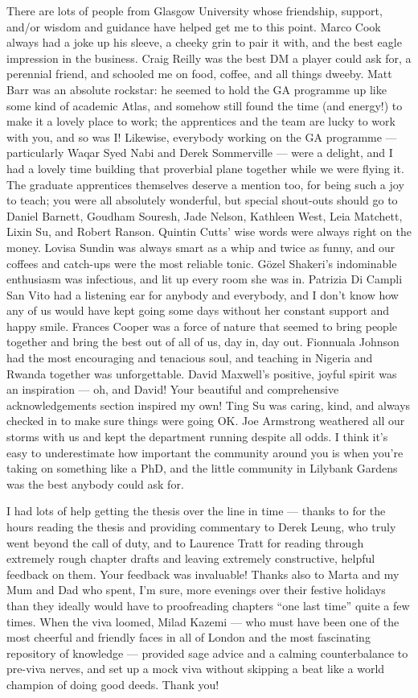 {There are lots of people from Glasgow University whose friendship, support,
and/or wisdom and guidance have helped get me to this point.
Marco Cook always had a joke up his sleeve, a cheeky grin to pair it with, and
the best eagle impression in the business. Craig Reilly was the best DM a player
could ask for, a perennial friend, and schooled me on food, coffee, and all
things dweeby. Matt Barr was an absolute rockstar: he seemed to hold the GA
programme up like some kind of academic Atlas, and somehow still found the time
(and energy!) to make it a lovely place to work; the apprentices and the team
are lucky to work with you, and so was I! Likewise, everybody working on the GA
programme --- particularly Waqar Syed Nabi and Derek Sommerville --- were a
delight, and I had a lovely time building that proverbial plane together while
we were flying it. The graduate apprentices themselves deserve a mention too,
for being such a joy to teach; you were all absolutely wonderful, but special
shout-outs should go to Daniel Barnett, Goudham Souresh, Jade Nelson, Kathleen
West, Leia Matchett, Lixin Su, and Robert Ranson. Quintin Cutts' wise words were
always right on the money. Lovisa Sundin was always smart as a whip and twice as
funny, and our coffees and catch-ups were the most reliable tonic. Gözel
Shakeri's indominable enthusiasm was infectious, and lit up every room she was
in. Patrizia Di Campli San Vito had a listening ear for anybody and everybody,
and I don't know how any of us would have kept going some days without her
constant support and happy smile. Frances Cooper was a force of nature that
seemed to bring people together and bring the best out of all of us, day in, day
out. Fionnuala Johnson had the most encouraging and tenacious soul, and teaching
in Nigeria and Rwanda together was unforgettable. David Maxwell's positive,
joyful spirit was an inspiration --- oh, and David! Your beautiful and
comprehensive acknowledgements section inspired my own! Ting Su was caring,
kind, and always checked in to make sure things were going OK. Joe Armstrong
weathered all our storms with us and kept the department running despite all
odds.
I think it's easy to underestimate how important the community around you is
when you're taking on something like a PhD, and the little community in Lilybank
Gardens was the best anybody could ask for.

I had lots of help getting the thesis over the line in time --- thanks to for
the hours reading the thesis and providing commentary to Derek Leung, who truly
went beyond the call of duty, and to Laurence Tratt for reading through
extremely rough chapter drafts and leaving extremely constructive, helpful
feedback on them. Your feedback was invaluable! Thanks also to Marta and my Mum
and Dad who spent, I'm sure, more evenings over their festive holidays than they
ideally would have to proofreading chapters ``one last time'' quite a few times.
When the viva loomed, Milad Kazemi --- who must have been one of the most
cheerful and friendly faces in all of London and the most fascinating repository
of knowledge --- provided sage advice and a calming counterbalance to pre-viva
nerves, and set up a mock viva without skipping a beat like a world champion of
doing good deeds. Thank you!

}
